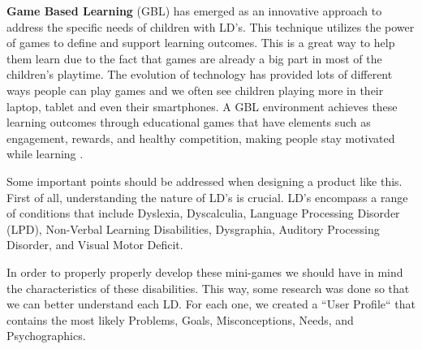 \textbf{Game Based Learning} (GBL) has emerged as an innovative approach to address the specific needs of children with LD's. This technique utilizes the power of games to define and support learning outcomes. This is a great way to help them learn due to the fact that games are already a big part in most of the children's playtime. The evolution of technology has provided lots of different ways people can play games and we often see children playing more in their laptop, tablet and even their smartphones. A GBL environment achieves these learning outcomes through educational games that have elements such as engagement, rewards, and healthy competition, making people stay motivated while learning \cite{gblProsCons}.


Some important points should be addressed when designing a product like this. First of all, understanding the nature of LD's is crucial. LD's encompass a range of conditions that include Dyslexia, Dyscalculia, Language Processing Disorder (LPD), Non-Verbal Learning Disabilities, Dysgraphia, Auditory Processing Disorder, and Visual Motor Deficit.

In order to properly properly develop these mini-games we should have in mind the characteristics of these disabilities. This way, some research was done so that we can better understand each LD. For each one, we created a ``User Profile`` that contains the most likely Problems, Goals, Misconceptions, Needs, and Psychographics.